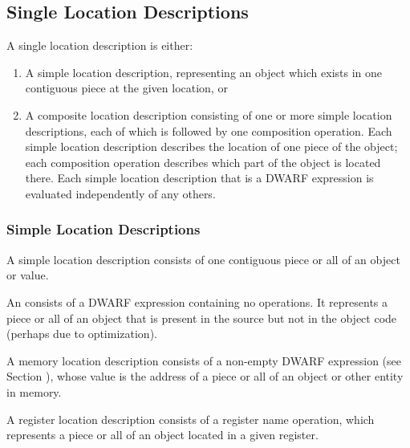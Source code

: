 \subsection{Single Location Descriptions}
\label{chap:singlelocationdescriptions}
A single location description is either:
\begin{enumerate}[1. ]
\item A simple location description, representing an object
which 
exists in one contiguous piece at the given location, or 
\item A composite location description consisting of one or more
simple location descriptions, each of which is followed by
one composition operation. Each simple location description
describes the location of one piece of the object; each
composition operation describes which part of the object is
located there. Each simple location description that is a
DWARF expression is evaluated independently of any others.
\end{enumerate}



\subsubsection{Simple Location Descriptions}
A 
simple location description consists of one 
contiguous piece or all of an object or value.

An 
consists of a DWARF expression
containing no operations. It represents a piece or all of an
object that is present in the source but not in the object code
(perhaps due to optimization).

A 
memory location description 
consists of a non-empty DWARF
expression (see 
Section ), 
whose value is the address of
a piece or all of an object or other entity in memory.

\label{chap:registerlocationdescriptions}
A register location description consists of a register name
operation, which represents a piece or all of an object
located in a given register.

